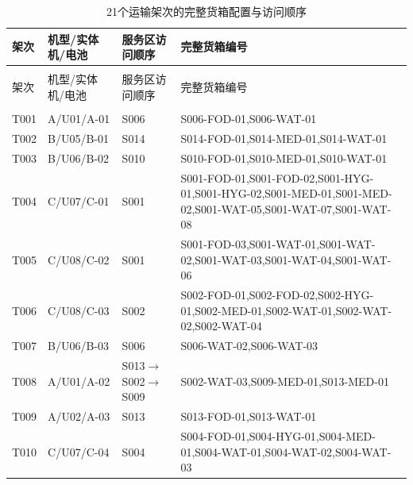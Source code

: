 \begin{longtable}{@{}>{\centering\arraybackslash}p{1.00cm}>{\raggedright\arraybackslash}p{2.80cm}>{\raggedright\arraybackslash}p{3.10cm}>{\raggedright\arraybackslash}p{7.60cm}@{}}
\caption{21个运输架次的完整货箱配置与访问顺序}\label{tab:q3-full-config}\\
\toprule
架次 & 机型/实体机/电池 & 服务区访问顺序 & 完整货箱编号 \\
\midrule
\endfirsthead
\multicolumn{4}{c}{\small 表~\thetable{}（续）}\\
\toprule
架次 & 机型/实体机/电池 & 服务区访问顺序 & 完整货箱编号 \\
\midrule
\endhead
\midrule
\multicolumn{4}{r}{\small 续下页}\\
\endfoot
\bottomrule
\endlastfoot
T001 & A/U01/A-01 & S006 & \mbox{S006-FOD-01},\allowbreak \mbox{S006-WAT-01} \\
T002 & B/U05/B-01 & S014 & \mbox{S014-FOD-01},\allowbreak \mbox{S014-MED-01},\allowbreak \mbox{S014-WAT-01} \\
T003 & B/U06/B-02 & S010 & \mbox{S010-FOD-01},\allowbreak \mbox{S010-MED-01},\allowbreak \mbox{S010-WAT-01} \\
T004 & C/U07/C-01 & S001 & \mbox{S001-FOD-01},\allowbreak \mbox{S001-FOD-02},\allowbreak \mbox{S001-HYG-01},\allowbreak \mbox{S001-HYG-02},\allowbreak \mbox{S001-MED-01},\allowbreak \mbox{S001-MED-02},\allowbreak \mbox{S001-WAT-05},\allowbreak \mbox{S001-WAT-07},\allowbreak \mbox{S001-WAT-08} \\
T005 & C/U08/C-02 & S001 & \mbox{S001-FOD-03},\allowbreak \mbox{S001-WAT-01},\allowbreak \mbox{S001-WAT-02},\allowbreak \mbox{S001-WAT-03},\allowbreak \mbox{S001-WAT-04},\allowbreak \mbox{S001-WAT-06} \\
T006 & C/U08/C-03 & S002 & \mbox{S002-FOD-01},\allowbreak \mbox{S002-FOD-02},\allowbreak \mbox{S002-HYG-01},\allowbreak \mbox{S002-MED-01},\allowbreak \mbox{S002-WAT-01},\allowbreak \mbox{S002-WAT-02},\allowbreak \mbox{S002-WAT-04} \\
T007 & B/U06/B-03 & S006 & \mbox{S006-WAT-02},\allowbreak \mbox{S006-WAT-03} \\
T008 & A/U01/A-02 & S013$\to$S002$\to$S009 & \mbox{S002-WAT-03},\allowbreak \mbox{S009-MED-01},\allowbreak \mbox{S013-MED-01} \\
T009 & A/U02/A-03 & S013 & \mbox{S013-FOD-01},\allowbreak \mbox{S013-WAT-01} \\
T010 & C/U07/C-04 & S004 & \mbox{S004-FOD-01},\allowbreak \mbox{S004-HYG-01},\allowbreak \mbox{S004-MED-01},\allowbreak \mbox{S004-WAT-01},\allowbreak \mbox{S004-WAT-02},\allowbreak \mbox{S004-WAT-03} \\

\end{longtable}
